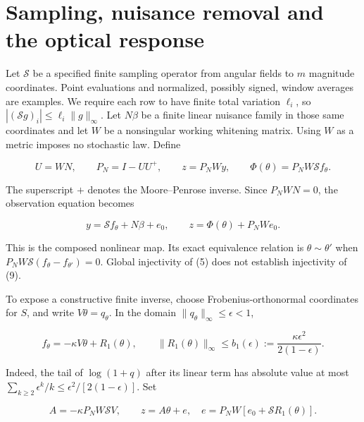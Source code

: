 \documentclass[aps,prd,reprint,onecolumn,11pt,nofootinbib,notitlepage]{revtex4-2}
\begin{document}
\section{Sampling, nuisance removal and the optical response}

Let \(\mathcal S\) be a specified finite sampling operator from angular fields to \(m\) magnitude coordinates. Point evaluations and normalized, possibly signed, window averages are examples. We require each row to have finite total variation \(\ell_i\), so \(|(\mathcal S g)_i|\le\ell_i\|g\|_\infty\). Let \(N\beta\) be a finite linear nuisance family in those same coordinates and let \(W\) be a nonsingular working whitening matrix. Using \(W\) as a metric imposes no stochastic law. Define

\begin{equation}
 U=WN,\qquad P_N=I-UU^+,\qquad
 z=P_NWy,\qquad
 \Phi(\theta)=P_NW\mathcal S f_\theta .\tag{9}
\end{equation}

The superscript \(+\) denotes the Moore--Penrose inverse. Since \(P_NWN=0\), the observation equation becomes

\begin{equation}
 y=\mathcal S f_\theta+N\beta+e_0,
 \qquad z=\Phi(\theta)+P_NWe_0 .\tag{10}
\end{equation}

This is the composed nonlinear map. Its exact equivalence relation is \(\theta\sim\theta'\) when \(P_NW\mathcal S(f_\theta-f_{\theta'})=0\). Global injectivity of (5) does not establish injectivity of (9).

To expose a constructive finite inverse, choose Frobenius-orthonormal coordinates for \(S\), and write \(V\theta=q_\theta\). In the domain \(\|q_\theta\|_\infty\le\epsilon<1\),

\begin{equation}
 f_\theta=-\kappa V\theta+R_1(\theta),\qquad
 \|R_1(\theta)\|_\infty\le
 b_1(\epsilon):=\frac{\kappa\epsilon^2}{2(1-\epsilon)} .\tag{11}
\end{equation}

Indeed, the tail of \(\log(1+q)\) after its linear term has absolute value at most \(\sum_{k\ge2}\epsilon^k/k\le\epsilon^2/[2(1-\epsilon)]\). Set

\begin{equation}
 A=-\kappa P_NW\mathcal S V,\qquad
 z=A\theta+e,\quad
 e=P_NW[e_0+\mathcal S R_1(\theta)].\tag{12}
\end{equation}
\end{document}

